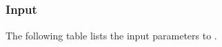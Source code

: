 \documentclass[10pt]{article}
\begin{document}
% 
% 
% 


\subsection{}  \label{ss:hypre-solve}

\subsubsection{Input} \label{sss:hypre-solve-input}

The following table lists the input parameters to .
\end{document}
